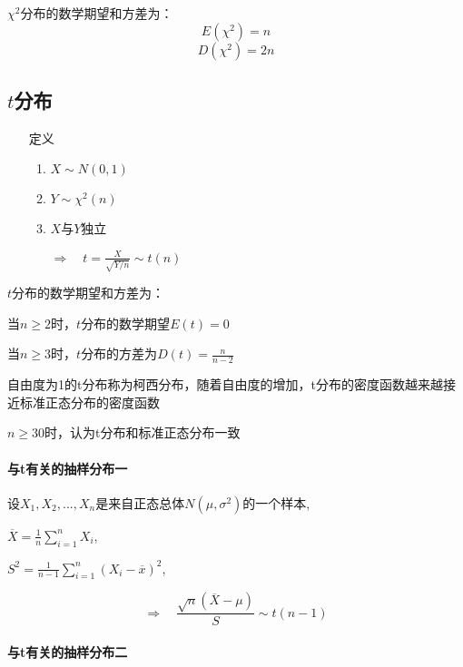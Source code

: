 \documentclass[UTF8,10pt]{book}
\begin{document}
            $\chi^2$分布的数学期望和方差为：
            $$E(\chi^2) = n $$
            $$D(\chi^2) = 2n $$

        \subsection{$t$分布}

            \begin{itemize}
                \item [定义] {
                    \begin{enumerate}
                        \item $X \sim N(0,1)$
                        \item $Y \sim \chi^2(n)$
                        \item $X$与$Y$独立
                        
                        $\Rightarrow \quad t = \frac{X}{\sqrt{Y/n}} \sim t(n)$ 
                    \end{enumerate}
                }
            \end{itemize}

            $t$分布的数学期望和方差为：

            {\kaishu 当$n \ge 2$时，$t$分布的数学期望$E(t)=0$}

            {\kaishu 当$n \ge 3$时，$t$分布的方差为$D(t) = \frac{n}{n-2}$ }

            {\kaishu 自由度为1的t分布称为柯西分布，随着自由度的增加，t分布的密度函数越来越接近标准正态分布的密度函数}

            {\kaishu $n \ge 30$时，认为t分布和标准正态分布一致}

            \paragraph{与t有关的抽样分布一}

            设$X_1,X_2,...,X_n$是来自正态总体$N(\mu,\sigma^2)$的一个样本,

            $ \overline{X} = \frac{1}{n} \sum_{i=1}^n X_i $,

            $ S^2 = \frac{1}{n-1}  \sum_{i=1}^n (X_i -\overline{x})^2 $,

            $$ \Rightarrow \quad \frac{\sqrt{n}(\overline{X}-\mu)}{S}  \sim t(n-1)$$

            \paragraph{与t有关的抽样分布二}
            
\end{document}
